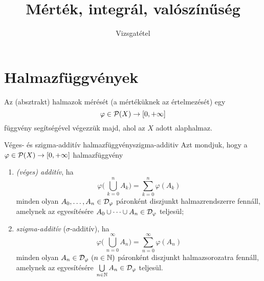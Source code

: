 \documentclass[
]{elteikthesis}[2024/04/26]
\title{Mérték, integrál, valószínűség} %
\subtitle{\circled{5} Vizsgatétel}
\begin{document}
	
	
	\section{Halmazfüggvények}
	
	Az (absztrakt) halmazok mérését (a mértéküknek az értelmezését) egy
	\[
		\varphi \in \mathcal{P}( X ) \to [0, +\infty]
	\]
	függvény segítségével végezzük majd, ahol az \( X \) adott alaphalmaz.
	
	\begin{definition}{Véges- és szigma-additív halmazfüggvény}{szigma-additiv}
		Azt mondjuk, hogy a \( \varphi \in \mathcal{P}( X ) \to [0, +\infty] \) halmazfüggvény
		\begin{enumerate}
			\item \emph{(véges) additív}, ha
			\[
				\varphi \Biggl(\, \bigcup_{k=0}^n A_k \Biggr) = \sum_{k=0}^n \varphi(A_k)
			\]
			minden olyan \( A_0, \dots, A_n \in \mathcal{D}_{\varphi} \) páronként diszjunkt halmazrendszerre fennáll, amelynek az egyesítésére
			\( A_0 \cup \cdots \cup A_n \in \mathcal{D}_{\varphi} \) teljesül;
			
			\item \emph{szigma-additív} (\( \sigma \)-additív), ha
			\[
				\varphi \Biggl(\, \bigcup_{n=0}^\infty A_n \Biggr) = 
				\sum_{n=0}^\infty \varphi(A_n)
			\]
			minden olyan \( A_n \in \mathcal{D}_{\varphi} \ (n \in \mathbb{N}) \) páronként diszjunkt halmazsorozatra fennáll, amelynek az egyesítésére 
			\( \bigcup\limits_{n \in \mathbb{N}} A_n \in \mathcal{D}_{\varphi} \) teljesül.
		\end{enumerate}
	\end{definition}
	
\end{document}
